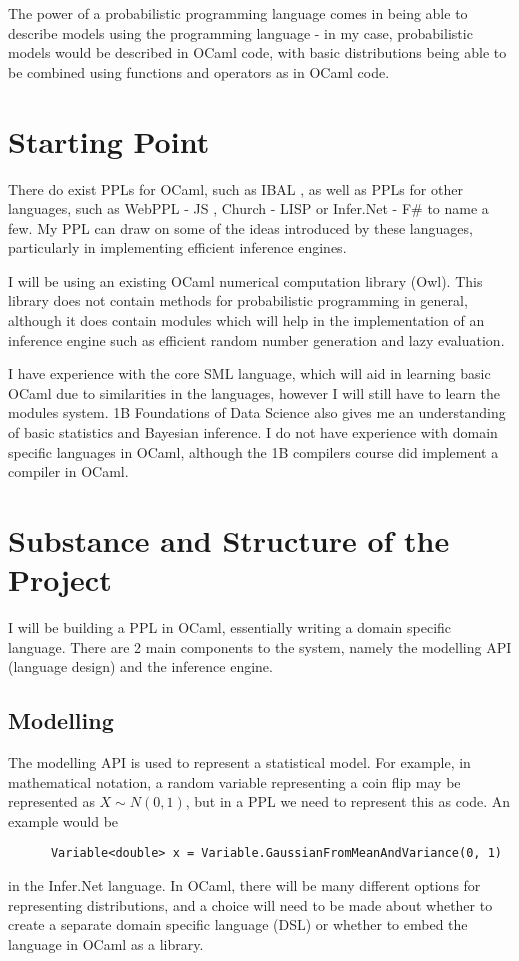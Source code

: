 The power of a probabilistic programming language comes in being able to describe models using the programming language - in my case, probabilistic models would be described in OCaml code, with basic distributions being able to be combined using functions and operators as in OCaml code.

\section*{Starting Point}

There do exist PPLs for OCaml, such as IBAL \cite{ibal}, as well as PPLs for other languages, such as WebPPL - JS \cite{mobus2018structure}, Church - LISP \cite{goodman2012church} or Infer.Net - F\# \cite{wang2011using} to name a few. My PPL can draw on some of the ideas introduced by these languages, particularly in implementing efficient inference engines.

I will be using an existing OCaml numerical computation library (Owl). This library does not contain methods for probabilistic programming in general, although it does contain modules which will help in the implementation of an inference engine such as efficient random number generation and lazy evaluation.

I have experience with the core SML language, which will aid in learning basic OCaml due to similarities in the languages, however I will still have to learn the modules system. 1B Foundations of Data Science also gives me an understanding of basic statistics and Bayesian inference. I do not have experience with domain specific languages in OCaml, although the 1B compilers course did implement a compiler in OCaml.

\section*{Substance and Structure of the Project}

I will be building a PPL in OCaml, essentially writing a domain specific language. There are 2 main components to the system, namely the modelling API (language design) and the inference engine.

\subsection*{Modelling}
The modelling API is used to represent a statistical model. For example, in mathematical notation, a random variable representing a coin flip may be represented as $X \sim N(0,1)$, but in a PPL we need to represent this as code. An example would be
\begin{verbatim}
      Variable<double> x = Variable.GaussianFromMeanAndVariance(0, 1)
\end{verbatim}
in the Infer.Net language. In OCaml, there will be many different options for representing distributions, and a choice will need to be made about whether to create a separate domain specific language (DSL) or whether to embed the language in OCaml as a library. 

